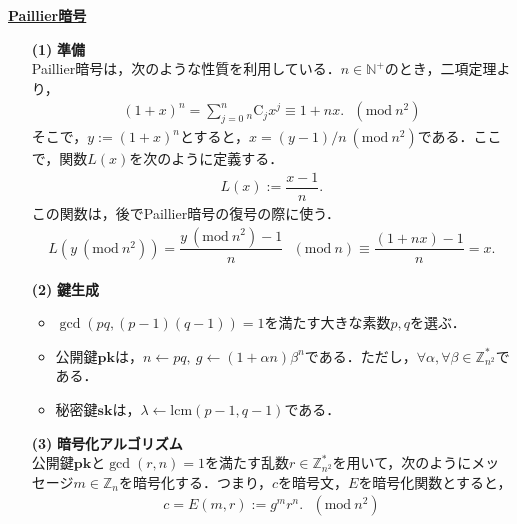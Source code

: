 \documentclass[a4paper]{jsarticle}
\begin{document}
\begin{center}
\LARGE \textbf{\underline{Paillier暗号}}
\end{center}
\begin{enumerate}
\item[\textbf{(1)}] \textbf{準備}\\
Paillier暗号は，次のような性質を利用している．$n \in \mathbb{N}^+$のとき，二項定理より，
\begin{align*}
(1 + x)^n = \sum^{n}_{j = 0}{}_n\mathrm{C}_{j}x^j\equiv 1 + nx.\ \ \  (\mathrm{mod}\  n^2)\tag*{(1)}
\end{align*}
そこで，$y := (1 + x)^n $とすると，$x = (y - 1)/n\ (\mathrm{mod}\  n^2)$である．ここで，関数$L(x)$を次のように定義する．
\begin{align*}
\label{funcL}
L(x) := \dfrac{x - 1}{n}.\tag*{(2)}
\end{align*}
この関数は，後でPaillier暗号の復号の際に使う．
\begin{align*}
L(y\ (\mathrm{mod}\  n^2)) =\dfrac{y\ (\mathrm{mod}\  n^2) - 1}{n}\ \ \ (\mathrm{mod}\  n)\equiv\dfrac{(1 + nx)- 1}{n}=x.\tag*{(3)}
\end{align*}

\item[\textbf{(2)}]\textbf{鍵生成}
\begin{itemize}
\item $\gcd(pq,(p-1)(q-1)) = 1$を満たす大きな素数$p,q$を選ぶ．
\item 公開鍵$\bm{pk}$は，$n\leftarrow pq, \ g\leftarrow (1+\alpha n)\beta^n$である．ただし，$\forall\alpha,\forall\beta\in\mathbb{Z}^{*}_{n^2}$である．
\item 秘密鍵$\bm{sk}$は，$\lambda\leftarrow \mathrm{lcm}(p-1, q-1)$である．
\end{itemize}




\item[\textbf{(3)}]\textbf{暗号化アルゴリズム}\\
公開鍵$\bm{pk}$と$\gcd(r,n) = 1$を満たす乱数$r\in\mathbb{Z}^{*}_{n^2}$を用いて，次のようにメッセージ$m\in\mathbb{Z}_{n}$を暗号化する．つまり，$c$を暗号文，$E$を暗号化関数とすると，
\begin{align*}
c=E(m,r):=g^mr^n.\ \ \ (\mathrm{mod}\  n^2)\tag*{(4)}
\end{align*}




\end{enumerate}
\end{document}
